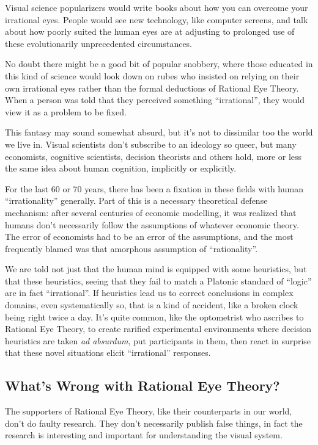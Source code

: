 \documentclass{article}
\begin{document}
Visual science popularizers would write books about how you can overcome your irrational eyes.
People would see new technology, like computer screens, and talk about how poorly suited the human eyes are at adjusting to prolonged use of these evolutionarily unprecedented circumstances.

No doubt there might be a good bit of popular snobbery, where those educated in this kind of science would look down on rubes who insisted on relying on their own irrational eyes rather than the formal deductions of Rational Eye Theory.
When a person was told that they perceived something ``irrational'', they would view it as a problem to be fixed.

This fantasy may sound somewhat absurd, but it's not to dissimilar too the world we live in.
Visual scientists don't subscribe to an ideology so queer, but many economists, cognitive scientists, decision theorists and others hold, more or less the same idea about human cognition, implicitly or explicitly.

For the last 60 or 70 years, there has been a fixation in these fields with human ``irrationality'' generally.
Part of this is a necessary theoretical defense mechanism: after several centuries of economic modelling, it was realized that humans don't necessarily follow the assumptions of whatever economic theory.
The error of economists had to be an error of the assumptions, and the most frequently blamed was that amorphous assumption of ``rationality''.

We are told not just that the human mind is equipped with some heuristics, but that these heuristics, seeing that they fail to match a Platonic standard of ``logic'' are in fact ``irrational''.
If heuristics lead us to correct conclusions in complex domains, even systematically so, that is a kind of accident, like a broken clock being right twice a day.
It's quite common, like the optometrist who ascribes to Rational Eye Theory, to create rarified experimental environments where decision heuristics are taken \textit{ad absurdum}, put participants in them, then react in surprise that these novel situations elicit ``irrational'' responses.

\subsection{What's Wrong with Rational Eye Theory?}

The supporters of Rational Eye Theory, like their counterparts in our world, don't do faulty research.
They don't necessarily publish false things, in fact the research is interesting and important for understanding the visual system.
\end{document}
